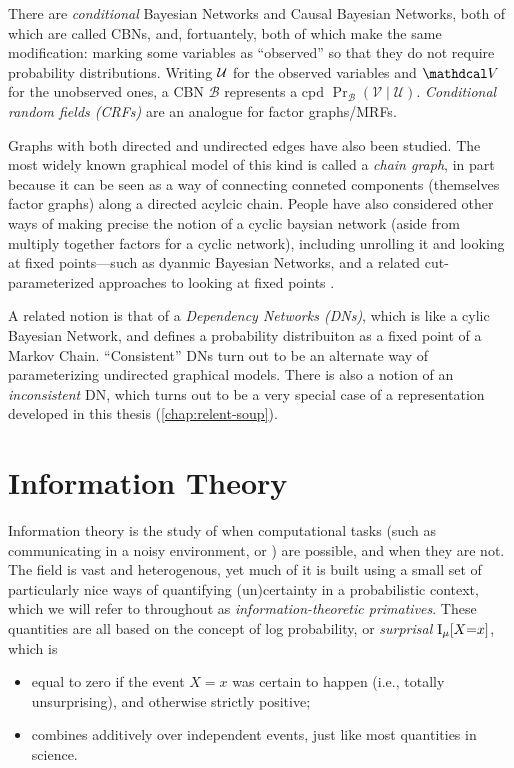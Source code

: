There are \emph{conditional} Bayesian Networks and Causal Bayesian Networks, both of which are called CBNs, and, fortuantely, both of which make the same modification: marking some variables as ``observed'' so that they do not require probability distributions. 
Writing $\mathcal U$ for the observed variables and $\V$ for the unobserved ones, a CBN $\mathcal B$ represents a cpd $\Pr_{\mathcal B}(\mathcal V \mid \mathcal U)$. 
%
\emph{Conditional random fields (CRFs)} are an analogue for factor graphs/MRFs.

Graphs with both directed and undirected edges have also been studied. The most widely known graphical model of this kind is called a \emph{chain graph}, in part because it can be seen as a way of connecting conneted components (themselves factor graphs) along a directed acylcic chain.
People have also considered other ways of making precise the notion of a cyclic baysian network (aside from multiply together factors for a cyclic network), including unrolling it and looking at fixed points---such as dyanmic Bayesian Networks, and a related cut-parameterized approaches to looking at fixed points \cite{Baier_2022}.

A related notion is that of a \emph{Dependency Networks (DNs)}, which is like a cylic Bayesian Network, and defines a probability distribuiton as a fixed point of a Markov Chain. 
``Consistent'' DNs turn out to be an alternate way of parameterizing undirected graphical models.
There is also a notion of an \emph{inconsistent} DN, which turns out to be a very special case of a representation developed in this thesis (\cref{chap:relent-soup}).


\section{Information Theory}

Information theory is the study of when computational tasks
    (such as communicating in a noisy environment, 
        or )
    are possible, and when they are not. 
%
The field is vast and heterogenous, 
    yet much of it is built using a small set of 
    particularly nice ways of quantifying (un)certainty in a probabilistic
    context, which we will refer to throughout as \emph{information-theoretic primatives}.
These quantities are all based on the concept of log probability, or \emph{surprisal} $\operatorname{\mathrm{I}}_{\mu}[ X{=}x]$, which is
\begin{itemize}[nosep]
\item equal to zero if the event $X{=}x$ was certain to happen (i.e., totally unsurprising), and otherwise strictly positive;
\item combines additively over independent events, just like most quantities in science.
\end{itemize}


